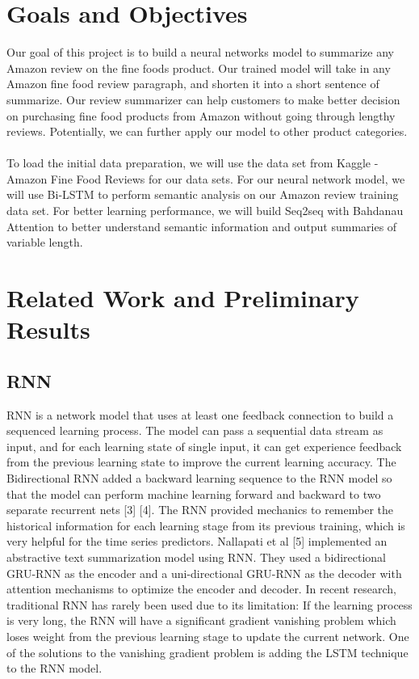 \documentclass[conference]{IEEEtran}
\begin{document}
\section{Goals and Objectives}
Our goal of this project is to build a neural networks model to summarize any Amazon review on the fine foods product. Our trained model will take in any Amazon fine food review paragraph, and shorten it into a short sentence of summarize. Our review summarizer can help customers to make better decision on purchasing fine food products from Amazon without going through lengthy reviews. Potentially, we can further apply our model to other product categories.\\\\
\indent To load the initial data preparation, we will use the data set from Kaggle - Amazon Fine Food Reviews for our data sets. For our neural network model, we will use Bi-LSTM to perform semantic analysis on our Amazon review training data set. For better learning performance, we will build Seq2seq with Bahdanau Attention to better understand semantic information and output summaries of variable length.

\section{Related Work and Preliminary Results}
\subsection{RNN}
RNN is a network model that uses at least one feedback connection to build a sequenced learning process. The model can pass a sequential data stream as input, and for each learning state of single input, it can get experience feedback from the previous learning state to improve the current learning accuracy. The Bidirectional RNN added a backward learning sequence to the RNN model so that the model can perform machine learning forward and backward to two separate recurrent nets [3] [4]. The RNN provided mechanics to remember the historical information for each learning stage from its previous training, which is very helpful for the time series predictors. Nallapati et al [5] implemented an abstractive text summarization model using RNN. They used a bidirectional GRU-RNN as the encoder and a uni-directional GRU-RNN as the decoder with attention mechanisms to optimize the encoder and decoder. In recent research, traditional RNN has rarely been used due to its limitation: If the learning process is very long, the RNN will have a significant gradient vanishing problem which loses weight from the previous learning stage to update the current network. One of the solutions to the vanishing gradient problem is adding the LSTM technique to the RNN model. 
\end{document}
